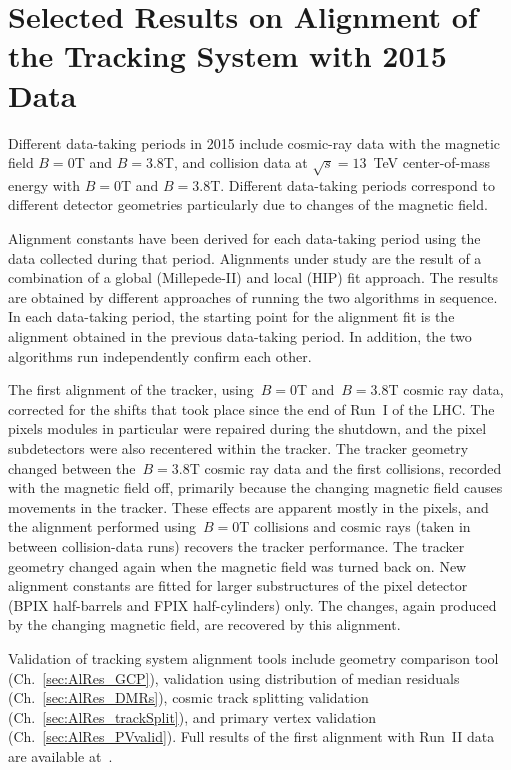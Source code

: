 \section{Selected Results on Alignment of the Tracking System with 2015 Data}
\label{sec:alignmentResults}

Different data-taking periods in 2015 include cosmic-ray data with the magnetic field $B=0$T and $B=3.8$T, and collision data at $\sqrt{s}=13$~TeV center-of-mass energy with $B=0$T and $B=3.8$T. Different data-taking periods correspond to different detector geometries particularly due to changes of the magnetic field. 

Alignment constants have been derived for each data-taking period using the data collected during that period. Alignments under study are the result of a combination of a global (Millepede-II) and local (HIP) fit approach. The results are obtained by different approaches of running the two algorithms in sequence. In each data-taking period, the starting point for the alignment fit is the alignment obtained in the previous data-taking period. In addition, the two algorithms run independently confirm each other. 

The first alignment of the tracker, using~$B=0$T and~$B=3.8$T cosmic ray data, corrected for the shifts that took place since the end of Run~I of the LHC. The pixels modules in particular were repaired during the shutdown, and the pixel subdetectors were also recentered within the tracker. The tracker geometry changed between the~$B=3.8$T cosmic ray data and the first collisions, recorded with the magnetic field off, primarily because the changing magnetic field causes movements in the tracker. These effects are apparent mostly in the pixels, and the alignment performed using~$B=0$T collisions and cosmic rays (taken in between collision-data runs) recovers the tracker performance. The tracker geometry changed again when the magnetic field was turned back on. New alignment constants are fitted for larger substructures of the pixel detector (BPIX half-barrels and FPIX half-cylinders) only. The changes, again produced by the changing magnetic field, are recovered by this alignment.

Validation of tracking system alignment tools include geometry comparison tool (Ch.~\ref{sec:AlRes_GCP}), validation using distribution of median residuals (Ch.~\ref{sec:AlRes_DMRs}), cosmic track splitting validation (Ch.~\ref{sec:AlRes_trackSplit}), and primary vertex validation (Ch.~\ref{sec:AlRes_PVvalid}). Full results of the first alignment with Run~II data are available at~\cite{ref_AlApproved_twiki}.

